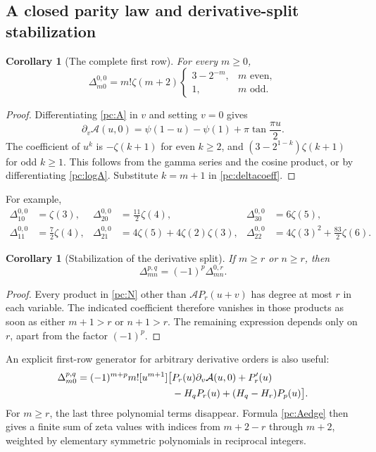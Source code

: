 \documentclass[11pt,a4paper]{article}
\numberwithin{equation}{section}
\newtheorem{corollary}[theorem]{Corollary}
\theoremstyle{definition}
\newcommand{\Af}{\mathcal A}
\begin{document}
\subsection{A closed parity law and derivative-split stabilization}
\begin{corollary}[The complete first row]\label{pc:edge}
For every $m\ge0$,
\begin{equation}\label{pc:edgeformula}
 \Delta_{m0}^{0,0}=m!\zeta(m+2)
 \begin{cases}
 3-2^{-m},&m\text{ even},\\
 1,&m\text{ odd}.
 \end{cases}
\end{equation}
\end{corollary}
\begin{proof}
Differentiating \eqref{pc:A} in $v$ and setting $v=0$ gives
\begin{equation}\label{pc:Aedge}
 \partial_v\Af(u,0)=\psi(1-u)-\psi(1)+\pi\tan\frac{\pi u}{2}.
\end{equation}
The coefficient of $u^k$ is $-\zeta(k+1)$ for even $k\ge2$, and
$(3-2^{1-k})\zeta(k+1)$ for odd $k\ge1$. This follows from the gamma series and the cosine product, or by differentiating \eqref{pc:logA}. Substitute $k=m+1$ in \eqref{pc:deltacoeff}.
\end{proof}
For example,
\begin{align*}
 \Delta_{10}^{0,0}&=\zeta(3),&
 \Delta_{20}^{0,0}&=\tfrac{11}{2}\zeta(4),&
 \Delta_{30}^{0,0}&=6\zeta(5),\\
 \Delta_{11}^{0,0}&=\tfrac72\zeta(4),&
 \Delta_{21}^{0,0}&=4\zeta(5)+4\zeta(2)\zeta(3),&
 \Delta_{22}^{0,0}&=4\zeta(3)^2+\tfrac{83}{2}\zeta(6).
\end{align*}

\begin{corollary}[Stabilization of the derivative split]\label{pc:stabilization}
If $m\ge r$ or $n\ge r$, then
\begin{equation}\label{pc:stabilizationformula}
 \Delta_{mn}^{p,q}=(-1)^p\Delta_{mn}^{0,r}.
\end{equation}
\end{corollary}
\begin{proof}
Every product in \eqref{pc:N} other than $\Af P_r(u+v)$ has degree at most $r$ in each variable. The indicated coefficient therefore vanishes in those products as soon as either $m+1>r$ or $n+1>r$. The remaining expression depends only on $r$, apart from the factor $(-1)^p$.
\end{proof}
An explicit first-row generator for arbitrary derivative orders is also useful:
\begin{align}\label{pc:general-edge}
 \Delta_{m0}^{p,q}=(-1)^{m+p}m![u^{m+1}]\bigl[
 &P_r(u)\partial_v\Af(u,0)+P_r'(u)\notag\\
 &-H_qP_r(u)+(H_q-H_r)P_p(u)\bigr].
\end{align}
For $m\ge r$, the last three polynomial terms disappear. Formula \eqref{pc:Aedge} then gives a finite sum of zeta values with indices from $m+2-r$ through $m+2$, weighted by elementary symmetric polynomials in reciprocal integers.
\end{document}

